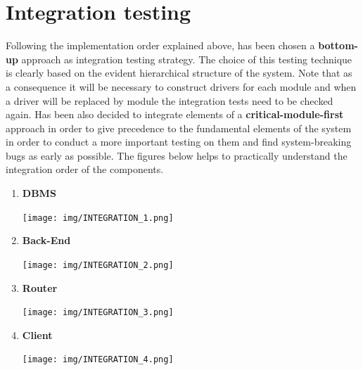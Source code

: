 \documentclass[a4paper]{report}
\begin{document}
\section{Integration testing}
Following the implementation order explained above, has been chosen a \textbf{bottom-up} approach as integration testing strategy. The choice of this testing technique is clearly based on the evident hierarchical structure of the system. Note that as a consequence it will be necessary to construct drivers for each module and when a driver will be replaced by module the integration tests need to be checked again. Has been also decided to integrate elements of a \textbf{critical-module-first} approach in order to give precedence to the fundamental elements of the system in order to conduct a more important testing on them and find system-breaking bugs as early as possible. The figures below helps to practically understand the integration order of the components.\newline
\begin{enumerate}
    \item \textbf{DBMS}\par
    \begin{minipage}{\linewidth}
        \centering
        \texttt{[image: img/INTEGRATION\_1.png]}
    \end{minipage}

    \item \textbf{Back-End}\par
    \begin{minipage}{\linewidth}
        \centering
        \texttt{[image: img/INTEGRATION\_2.png]}
    \end{minipage}\newline\newline

    \item \textbf{Router}\par
    \begin{minipage}{\linewidth}
        \centering
        \texttt{[image: img/INTEGRATION\_3.png]}
    \end{minipage}

    \item \textbf{Client}\par
    \begin{minipage}{\linewidth}
        \centering
        \texttt{[image: img/INTEGRATION\_4.png]}
    \end{minipage}
\end{enumerate}
\end{document}

